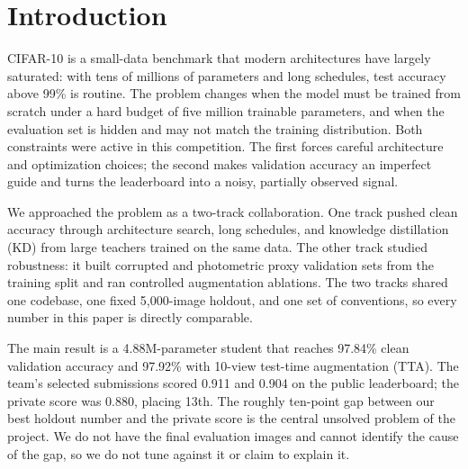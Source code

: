 \section{Introduction}

CIFAR-10 is a small-data benchmark that modern architectures have largely
saturated: with tens of millions of parameters and long schedules, test accuracy
above 99\% is routine. The problem changes when the model must be trained from
scratch under a hard budget of five million trainable parameters, and when the
evaluation set is hidden and may not match the training distribution. Both
constraints were active in this competition. The first forces careful
architecture and optimization choices; the second makes validation accuracy an
imperfect guide and turns the leaderboard into a noisy, partially observed
signal.

We approached the problem as a two-track collaboration. One track pushed clean
accuracy through architecture search, long schedules, and knowledge distillation
(KD) from large teachers trained on the same data. The other track studied
robustness: it built corrupted and photometric proxy validation sets from the
training split and ran controlled augmentation ablations. The two tracks shared
one codebase, one fixed 5,000-image holdout, and one set of conventions, so every
number in this paper is directly comparable.

The main result is a 4.88M-parameter student that reaches 97.84\% clean
validation accuracy and 97.92\% with 10-view test-time augmentation (TTA). The
team's selected submissions scored 0.911 and 0.904 on the public leaderboard;
the private score was 0.880, placing 13th. The roughly ten-point gap between our
best holdout number and the private score is the central unsolved problem of the
project. We do not have the final evaluation images and cannot identify the cause
of the gap, so we do not tune against it or claim to explain it.


